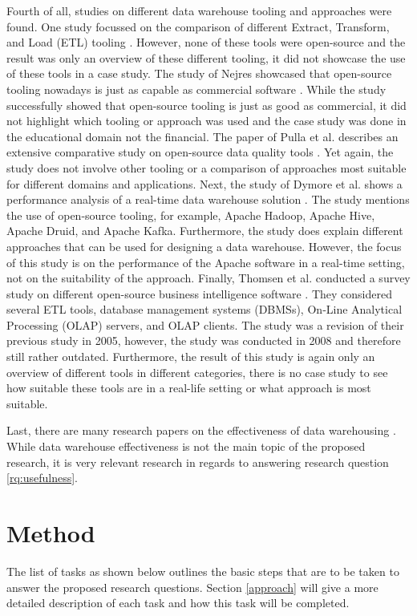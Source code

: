 \documentclass[11pt]{article}
\begin{document}
Fourth of all, studies on different data warehouse tooling and approaches were found. One study focussed on the comparison of different Extract, Transform, and Load (ETL) tooling \cite{etl_comparison}. However, none of these tools were open-source and the result was only an overview of these different tooling, it did not showcase the use of these tools in a case study. The study of Nejres showcased that open-source tooling nowadays is just as capable as commercial software \cite{nejres2015analysis}. While the study successfully showed that open-source tooling is just as good as commercial, it did not highlight which tooling or approach was used and the case study was done in the educational domain not the financial. The paper of Pulla et al. describes an extensive comparative study on open-source data quality tools \cite{pulla2016open}. Yet again, the study does not involve other tooling or a comparison of approaches most suitable for different domains and applications. Next, the study of Dymore et al. shows a performance analysis of a real-time data warehouse solution \cite{dymora2023performance}. The study mentions the use of open-source tooling, for example, Apache Hadoop, Apache Hive, Apache Druid, and Apache Kafka. Furthermore, the study does explain different approaches that can be used for designing a data warehouse. However, the focus of this study is on the performance of the Apache software in a real-time setting, not on the suitability of the approach. Finally, Thomsen et al. conducted a survey study on different open-source business intelligence software \cite{thomsen2009survey}. They considered several ETL tools, database management systems (DBMSs), On‐Line Analytical Processing (OLAP) servers, and OLAP clients. The study was a revision of their previous study in 2005, however, the study was conducted in 2008 and therefore still rather outdated. Furthermore, the result of this study is again only an overview of different tools in different categories, there is no case study to see how suitable these tools are in a real-life setting or what approach is most suitable.

Last, there are many research papers on the effectiveness of data warehousing \cite{al2023empirical, rahman2022empirical, ramamurthy2008data}. While data warehouse effectiveness is not the main topic of the proposed research, it is very relevant research in regards to answering research question \ref{rq:usefulness}. \\

\section{Method}
\label{method}
The list of tasks as shown below outlines the basic steps that are to be taken to answer the proposed research questions. Section \ref{approach} will give a more detailed description of each task and how this task will be completed.
\end{document}
